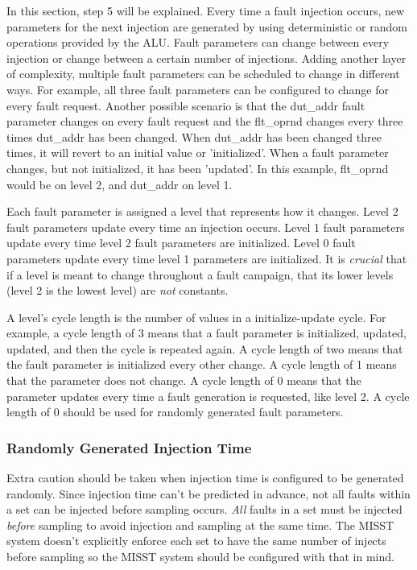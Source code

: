 \documentclass[]{report}
\begin{document}
In this section, step 5 will be explained. Every time a fault injection occurs, new parameters for the next injection are generated by using deterministic or random operations provided by the ALU. Fault parameters can change between every injection or change between a certain number of injections. Adding another layer of complexity, multiple fault parameters can be scheduled to change in different ways. For example, all three fault parameters can be configured to change for every fault request. Another possible scenario is that the dut\_addr fault parameter changes on every fault request and the flt\_oprnd changes every three times dut\_addr has been changed. When dut\_addr has been changed three times, it will revert to an initial value or 'initialized'. When a fault parameter changes, but not initialized, it has been 'updated'. In this example, flt\_oprnd would be on level 2, and dut\_addr on level 1.

Each fault parameter is assigned a level that represents how it changes. Level 2 fault parameters update every time an injection occurs. Level 1 fault parameters update every time level 2 fault parameters are initialized. Level 0 fault parameters update every time level 1 parameters are initialized. It is \textit{crucial} that if a level is meant to change throughout a fault campaign, that its lower levels (level 2 is the lowest level) are \textit{not} constants. 

A level's cycle length is the number of values in a initialize-update cycle. For example, a cycle length of 3 means that a fault parameter is initialized, updated, updated, and then the cycle is repeated again. A cycle length of two means that the fault parameter is initialized every other change. A cycle length of 1 means that the parameter does not change. A cycle length of 0 means that the parameter updates every time a fault generation is requested, like level 2. A cycle length of 0 should be used for randomly generated fault parameters.

\subsubsection{Randomly Generated Injection Time}
\label{ss rand gen inj time}

Extra caution should be taken when injection time is configured to be generated randomly. Since injection time can't be predicted in advance, not all faults within a set can be injected before sampling occurs. \textit{All} faults in a set must be injected \textit{before} sampling to avoid injection and sampling at the same time. The MISST system doesn't explicitly enforce each set to have the same number of injects before sampling so the MISST system should be configured with that in mind. 
\end{document}
